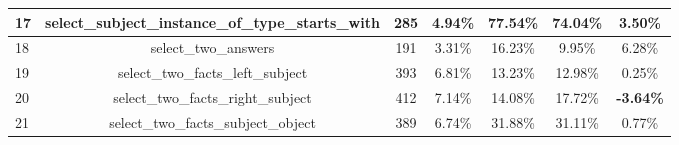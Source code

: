 \begin{table}[h!]
{\begin{tabular}{|l|c|cc|cc|c|}
    17                           & select\_subject\_instance\_of\_type\_starts\_with                                                                      & 285                                                 & 4.94\%                                                                          & 77.54\%                                                                                                & 74.04\%                                                                                & 3.50\%                                  \\ \hline
    18                           & select\_two\_answers                                                                                                   & 191                                                 & 3.31\%                                                                          & 16.23\%                                                                                                & 9.95\%                                                                                 & 6.28\%                                  \\ \hline
    19                           & select\_two\_facts\_left\_subject                                                                                      & 393                                                 & 6.81\%                                                                          & 13.23\%                                                                                                & 12.98\%                                                                                & 0.25\%                                  \\ \hline
    20                           & select\_two\_facts\_right\_subject                                                                                     & 412                                                 & 7.14\%                                                                          & 14.08\%                                                                                                & 17.72\%                                                                                & \textbf{-3.64\%}                        \\ \hline
    21                           & select\_two\_facts\_subject\_object                                                                                    & 389                                                 & 6.74\%                                                                          & 31.88\%                                                                                                & 31.11\%                                                                                & 0.77\%                                  \\ \hline

\end{tabular}}
\end{table}
